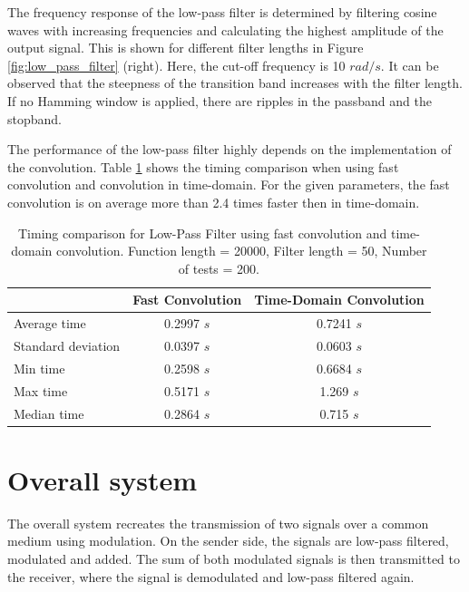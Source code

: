 \documentclass[12pt, a4paper]{report}
\begin{document}
The frequency response of the low-pass filter is determined by filtering cosine waves with increasing frequencies
and calculating the highest amplitude of the output signal.
This is shown for different filter lengths in Figure \ref{fig:low_pass_filter} (right).
Here, the cut-off frequency is 10 \({rad}/s\).
It can be observed that the steepness of the transition band increases with the filter length.
If no Hamming window is applied, there are ripples in the passband and the stopband.

The performance of the low-pass filter highly depends on the implementation of the convolution.
Table \ref{tab:timing_comparison} shows the timing comparison when using fast convolution and convolution in time-domain.
For the given parameters, the fast convolution is on average more than 2.4 times faster then in time-domain.
\begin{table}[h!]
	\centering
	\begin{tabular}{|l|c|c|}
		\hline
		                   & \textbf{Fast Convolution} & \textbf{Time-Domain Convolution} \\ \hline
		Average time       & 0.2997 \(s\)              & 0.7241 \(s\)                     \\ \hline
		Standard deviation & 0.0397 \(s\)              & 0.0603 \(s\)                     \\ \hline
		Min time           & 0.2598 \(s\)              & 0.6684 \(s\)                     \\ \hline
		Max time           & 0.5171 \(s\)              & 1.269 \(s\)                      \\ \hline
		Median time        & 0.2864 \(s\)              & 0.715 \(s\)                      \\ \hline
	\end{tabular}
	\caption{Timing comparison for Low-Pass Filter using fast convolution and time-domain convolution. Function length = 20000, Filter length = 50, Number of tests = 200.}
	\label{tab:timing_comparison}
\end{table}

\chapter{Overall system}

The overall system recreates the transmission of two signals over a common medium using modulation.
On the sender side, the signals are low-pass filtered, modulated and added.
The sum of both modulated signals is then transmitted to the receiver,
where the signal is demodulated and low-pass filtered again.
\end{document}
